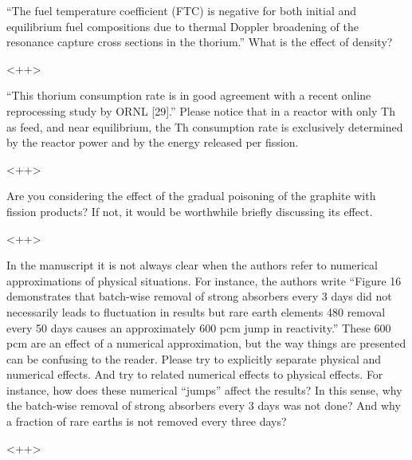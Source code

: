 \documentclass[answers,11pt]{exam}
\begin{document}
\begin{questions}

        \question ``The fuel temperature coefficient (FTC) is negative for both 
        initial and equilibrium fuel compositions due to thermal Doppler 
        broadening of the resonance capture cross sections in the thorium.'' 
        What is the effect of density?
        \begin{solution}
                <++>
        \end{solution}


        \question ``This thorium consumption rate is in good agreement with a 
        recent online reprocessing study by ORNL [29].'' Please notice that in a 
        reactor with only Th as feed, and near equilibrium, the Th consumption 
        rate is  exclusively determined by the reactor power and by the energy 
        released per fission.  
        \begin{solution}
                <++>
        \end{solution}


        \question Are you considering the effect of the gradual poisoning of 
        the graphite with fission products? If not, it would be worthwhile 
        briefly discussing its effect.
        \begin{solution}
                <++>
        \end{solution}


        \question In the manuscript it is not always clear when the authors 
        refer to numerical approximations of physical situations. For instance, 
        the authors write ``Figure 16 demonstrates that batch-wise removal of 
        strong absorbers every 3 days did not necessarily leads to fluctuation 
        in results but rare earth elements 480 removal every 50 days causes an 
        approximately 600 pcm jump in reactivity.'' These 600 pcm are an effect 
        of a numerical approximation, but the way things are presented can be 
        confusing to the reader. Please try to explicitly separate physical and 
        numerical effects. And try to related numerical effects to physical 
        effects. For instance, how does these numerical ``jumps'' affect the 
        results?  In this sense, why the batch-wise removal of strong absorbers 
        every 3 days  was not done? And why a fraction of rare earths  is not 
        removed every three days?
        \begin{solution}
                <++>
        \end{solution}


\end{questions}
\end{document}
